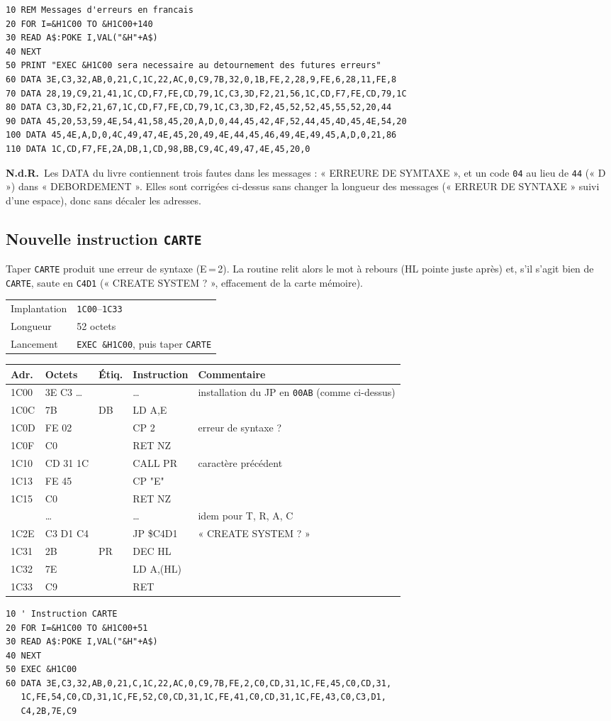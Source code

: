 \documentclass[a4paper,10pt]{article}
\makeatletter
\newcommand{\hex}[1]{\texttt{#1}}
\newcommand{\nota}[1]{\textcolor{red!60!black}{\small\textbf{N.d.R.}~#1}}
\newcommand{\fiche}[3]{%
  \begin{center}\small
  \begin{tabular}{@{}ll@{}}
  \toprule
  Implantation & #1 \\
  Longueur & #2 \\
  Lancement & #3 \\
  \bottomrule
  \end{tabular}
  \end{center}}
\newenvironment{asm}
  {\small\begin{longtable}{@{}>{\ttfamily}l>{\ttfamily}l>{\ttfamily}l>{\ttfamily}l>{\raggedright\arraybackslash}p{6.2cm}@{}}
   \toprule
   \normalfont\bfseries Adr. & \normalfont\bfseries Octets & \normalfont\bfseries Étiq. & \normalfont\bfseries Instruction & \textbf{Commentaire}\\
   \midrule\endhead
   \bottomrule\endfoot}
  {\end{longtable}}
\makeatother
\begin{document}
\begin{verbatim}
10 REM Messages d'erreurs en francais
20 FOR I=&H1C00 TO &H1C00+140
30 READ A$:POKE I,VAL("&H"+A$)
40 NEXT
50 PRINT "EXEC &H1C00 sera necessaire au detournement des futures erreurs"
60 DATA 3E,C3,32,AB,0,21,C,1C,22,AC,0,C9,7B,32,0,1B,FE,2,28,9,FE,6,28,11,FE,8
70 DATA 28,19,C9,21,41,1C,CD,F7,FE,CD,79,1C,C3,3D,F2,21,56,1C,CD,F7,FE,CD,79,1C
80 DATA C3,3D,F2,21,67,1C,CD,F7,FE,CD,79,1C,C3,3D,F2,45,52,52,45,55,52,20,44
90 DATA 45,20,53,59,4E,54,41,58,45,20,A,D,0,44,45,42,4F,52,44,45,4D,45,4E,54,20
100 DATA 45,4E,A,D,0,4C,49,47,4E,45,20,49,4E,44,45,46,49,4E,49,45,A,D,0,21,86
110 DATA 1C,CD,F7,FE,2A,DB,1,CD,98,BB,C9,4C,49,47,4E,45,20,0
\end{verbatim}
\nota{Les DATA du livre contiennent trois fautes dans les messages :
« ERREURE DE SYMTAXE », et un code \hex{04} au lieu de \hex{44} (« D ») dans
« DEBORDEMENT ». Elles sont corrigées ci-dessus sans changer la longueur
des messages (« ERREUR DE SYNTAXE » suivi d'une espace), donc sans décaler
les adresses.}

\subsection{Nouvelle instruction \texttt{CARTE}}
Taper \texttt{CARTE} produit une erreur de syntaxe (E\,=\,2). La routine
relit alors le mot à rebours (HL pointe juste après) et, s'il s'agit bien de
\texttt{CARTE}, saute en \hex{C4D1} (« CREATE SYSTEM ? », effacement de la
carte mémoire).
\fiche{\hex{1C00}--\hex{1C33}}{52 octets}{\texttt{EXEC \&H1C00}, puis taper \texttt{CARTE}}
\begin{asm}
1C00 & 3E C3 \dots & & \dots         & installation du JP en \hex{00AB} (comme ci-dessus) \\
1C0C & 7B       & DB & LD A,E        & \\
1C0D & FE 02    & & CP 2             & erreur de syntaxe ? \\
1C0F & C0       & & RET NZ           & \\
1C10 & CD 31 1C & & CALL PR          & caractère précédent \\
1C13 & FE 45    & & CP "E"           & \\
1C15 & C0       & & RET NZ           & \\
 & \dots & & \dots & idem pour T, R, A, C \\
1C2E & C3 D1 C4 & & JP \$C4D1       & « CREATE SYSTEM ? » \\
1C31 & 2B       & PR & DEC HL        & \\
1C32 & 7E       & & LD A,(HL)        & \\
1C33 & C9       & & RET              & \\
\end{asm}
\begin{verbatim}
10 ' Instruction CARTE
20 FOR I=&H1C00 TO &H1C00+51
30 READ A$:POKE I,VAL("&H"+A$)
40 NEXT
50 EXEC &H1C00
60 DATA 3E,C3,32,AB,0,21,C,1C,22,AC,0,C9,7B,FE,2,C0,CD,31,1C,FE,45,C0,CD,31,
   1C,FE,54,C0,CD,31,1C,FE,52,C0,CD,31,1C,FE,41,C0,CD,31,1C,FE,43,C0,C3,D1,
   C4,2B,7E,C9
\end{verbatim}
\end{document}
